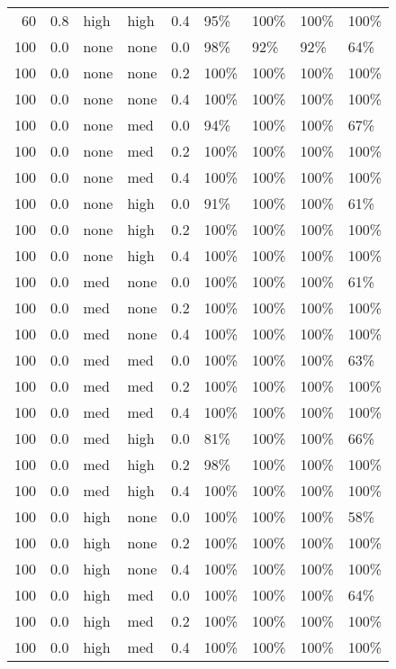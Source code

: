 \begin{longtable}{rrllrllll}
  60 & 0.8 & high & high & 0.4 & 95\% & 100\% & 100\% & 100\% \\ 
  100 & 0.0 & none & none & 0.0 & 98\% & 92\% & 92\% & 64\% \\ 
  100 & 0.0 & none & none & 0.2 & 100\% & 100\% & 100\% & 100\% \\ 
  100 & 0.0 & none & none & 0.4 & 100\% & 100\% & 100\% & 100\% \\ 
  100 & 0.0 & none & med & 0.0 & 94\% & 100\% & 100\% & 67\% \\ 
  100 & 0.0 & none & med & 0.2 & 100\% & 100\% & 100\% & 100\% \\ 
  100 & 0.0 & none & med & 0.4 & 100\% & 100\% & 100\% & 100\% \\ 
  100 & 0.0 & none & high & 0.0 & 91\% & 100\% & 100\% & 61\% \\ 
  100 & 0.0 & none & high & 0.2 & 100\% & 100\% & 100\% & 100\% \\ 
  100 & 0.0 & none & high & 0.4 & 100\% & 100\% & 100\% & 100\% \\ 
  100 & 0.0 & med & none & 0.0 & 100\% & 100\% & 100\% & 61\% \\ 
  100 & 0.0 & med & none & 0.2 & 100\% & 100\% & 100\% & 100\% \\ 
  100 & 0.0 & med & none & 0.4 & 100\% & 100\% & 100\% & 100\% \\ 
  100 & 0.0 & med & med & 0.0 & 100\% & 100\% & 100\% & 63\% \\ 
  100 & 0.0 & med & med & 0.2 & 100\% & 100\% & 100\% & 100\% \\ 
  100 & 0.0 & med & med & 0.4 & 100\% & 100\% & 100\% & 100\% \\ 
  100 & 0.0 & med & high & 0.0 & 81\% & 100\% & 100\% & 66\% \\ 
  100 & 0.0 & med & high & 0.2 & 98\% & 100\% & 100\% & 100\% \\ 
  100 & 0.0 & med & high & 0.4 & 100\% & 100\% & 100\% & 100\% \\ 
  100 & 0.0 & high & none & 0.0 & 100\% & 100\% & 100\% & 58\% \\ 
  100 & 0.0 & high & none & 0.2 & 100\% & 100\% & 100\% & 100\% \\ 
  100 & 0.0 & high & none & 0.4 & 100\% & 100\% & 100\% & 100\% \\ 
  100 & 0.0 & high & med & 0.0 & 100\% & 100\% & 100\% & 64\% \\ 
  100 & 0.0 & high & med & 0.2 & 100\% & 100\% & 100\% & 100\% \\ 
  100 & 0.0 & high & med & 0.4 & 100\% & 100\% & 100\% & 100\% \\ 

\end{longtable}
